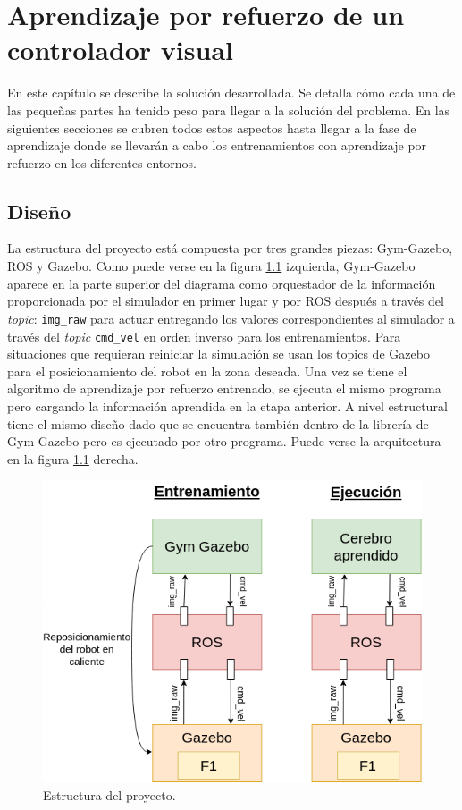 \chapter{Aprendizaje por refuerzo de un controlador visual}\label{desarrollo}

En este capítulo se describe la solución desarrollada. Se detalla cómo cada una de las pequeñas partes ha tenido peso para llegar a la solución del problema. En las siguientes secciones se cubren todos estos aspectos hasta llegar a la fase de aprendizaje donde se llevarán a cabo los entrenamientos con aprendizaje por refuerzo en los diferentes entornos.

\section{Diseño}

La estructura del proyecto está compuesta por tres grandes piezas: Gym-Gazebo, ROS y Gazebo. Como puede verse en la figura \ref{fig:project-structure} izquierda, Gym-Gazebo aparece en la parte superior del diagrama como orquestador de la información proporcionada por el simulador en primer lugar y por ROS después a través del \textit{topic}: \texttt{img\_raw} para actuar entregando los valores correspondientes al simulador a través del \textit{topic} \texttt{cmd\_vel} en orden inverso para los entrenamientos. Para situaciones que requieran reiniciar la simulación se usan los topics de Gazebo para el posicionamiento del robot en la zona deseada. Una vez se tiene el algoritmo de aprendizaje por refuerzo entrenado, se ejecuta el mismo programa pero cargando la información aprendida en la etapa anterior. A nivel estructural tiene el mismo diseño dado que se encuentra también dentro de la librería de Gym-Gazebo pero es ejecutado por otro programa. Puede verse la arquitectura en la figura \ref{fig:project-structure}  derecha.

\begin{figure}[!ht]
    \centering \includegraphics[width=0.5\columnwidth]{./figures/chapter_4/project-structure.png}
    \caption{
        \label{fig:project-structure}
            Estructura del proyecto.
    }
\end{figure}

